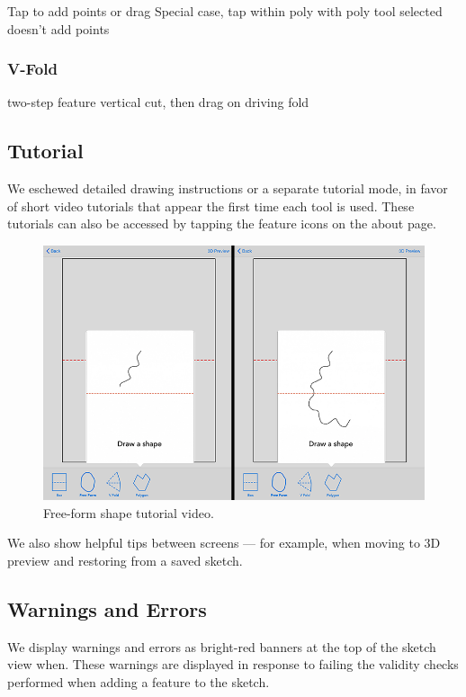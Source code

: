 Tap to add points or drag Special case, tap within poly with poly tool
selected doesn't add points

\subsubsection{V-Fold}\label{v-fold}

two-step feature vertical cut, then drag on driving fold

\subsection{Tutorial}\label{tutorial}

We eschewed detailed drawing instructions or a separate tutorial mode,
in favor of short video tutorials that appear the first time each tool
is used. These tutorials can also be accessed by tapping the feature
icons on the about page.

\begin{figure}[htbp]
\centering
\includegraphics{figures/32_UI_Tool_Interactions/tutorial_step_one_two.png}
\caption{Free-form shape tutorial video.}
\end{figure}

We also show helpful tips between screens --- for example, when moving
to 3D preview and restoring from a saved sketch.

\subsection{Warnings and Errors}\label{warnings-and-errors}

We display warnings and errors as bright-red banners at the top of the
sketch view when. These warnings are displayed in response to failing
the validity checks performed when adding a feature to the sketch.

